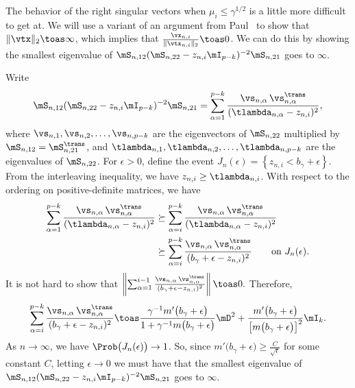 The behavior of the right singular vectors when $\mu_i \leq \gamma^{1/2}$ is
a little more difficult to get at.  We will use a variant of an argument from Paul~\cite{paul2007ase} to show that $\| \vtx \|_2 \toas \infty$, which implies that $\frac{ \vx_{n,i} }{ \| \vtx_{n,i} \|_2 } \toas 0$.  We can
do this by showing the smallest eigenvalue of 
\(
    \mS_{n,12}
    ( \mS_{n,22} - z_{n,i} \mI_{p-k} )^{-2} 
    \mS_{n,21}
\)
goes to $\infty$.

Write
\[
    \mS_{n,12}
    ( \mS_{n,22} - z_{n,i} \mI_{p-k} )^{-2} 
    \mS_{n,21}
        =
        \sum_{\alpha=1}^{p-k}
            \frac{ \vs_{n,\alpha} \, \vs_{n,\alpha}^\trans }
                 { ( \tlambda_{n,\alpha} - z_{n,i} )^2 },
\]
where $\vs_{n,1}, \vs_{n,2}, \ldots, \vs_{n,p-k}$ are the 
eigenvectors of $\mS_{n,22}$ multiplied by $\mS_{n,12} = \mS_{n,21}^\trans$, and
$\tlambda_{n,1}, \tlambda_{n,2}, \ldots, \tlambda_{n,p-k}$ are the eigenvalues
of $\mS_{n,22}$.  For $\epsilon > 0$, define the event 
\(
    J_{n}(\epsilon)
    =
    \left\{
        z_{n,i} < b_\gamma + \epsilon
    \right\}.
\)
From the interleaving inequality, we have $z_{n,i} \geq \tlambda_{n,i}$.
With respect to the ordering on positive-definite matrices, we have
\begin{align*}
    \sum_{\alpha=1}^{p-k}
            \frac{ \vs_{n,\alpha} \, \vs_{n,\alpha}^\trans }
                 { ( \tlambda_{n,\alpha} - z_{n,i} )^2 }
        &\succeq
            \sum_{\alpha=i}^{p-k}
                    \frac{ \vs_{n,\alpha} \, \vs_{n,\alpha}^\trans }
                         { ( \tlambda_{n,\alpha} - z_{n,i} )^2 } \\
        &\succeq
            \sum_{\alpha=i}^{p-k}
                    \frac{ \vs_{n,\alpha} \, \vs_{n,\alpha}^\trans }
                         { ( b_\gamma + \epsilon - z_{n,i} )^2 }
            \qquad\text{on $J_n(\epsilon)$.}
\end{align*}
It is not hard to show that
\(
    \left\|
        \sum_{\alpha=1}^{i-1}
                \frac{ \vs_{n,\alpha} \, \vs_{n,\alpha}^\trans }
                     { ( b_\gamma + \epsilon - z_{n,i} )^2 }
    \right\|
        \toas 0.
\)
Therefore,
\[
    \sum_{\alpha=i}^{p-k}
            \frac{ \vs_{n,\alpha} \, \vs_{n,\alpha}^\trans }
                 { ( b_\gamma + \epsilon - z_{n,i} )^2 }
        \toas
        \frac{ \gamma^{-1} m'\big( b_\gamma + \epsilon \big) }
             { 1 + \gamma^{-1} m\big( b_\gamma + \epsilon \big)}
        \mD^2
        +
        \frac{ m'\big( b_\gamma + \epsilon \big) }
             { \left[ m\big( b_\gamma + \epsilon \big) \right]^2}
        \mI_k.
\]
As $n\to\infty$, we have $\Prob\big( J_n(\epsilon) \big) \to 1$.  So,
since $m'\big( b_\gamma + \epsilon \big) \geq \frac{C}{\sqrt{\epsilon}}$
for some constant $C$, 
letting $\epsilon \to 0$ we must have that the smallest eigenvalue of
\(
    \mS_{n,12}
    ( \mS_{n,22} - z_{n,i} \mI_{p-k} )^{-2} 
    \mS_{n,21}
\)
goes to $\infty$.

